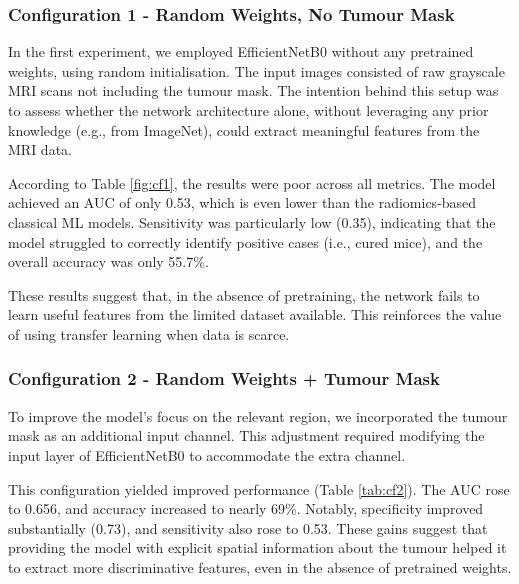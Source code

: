 \documentclass[12pt, a4paper]{report}
\begin{document}
\subsubsection{Configuration 1 - Random Weights, No Tumour Mask}

In the first experiment, we employed EfficientNetB0 without any pretrained weights, using random initialisation. The input images consisted of raw grayscale MRI scans not including the tumour mask. The intention behind this setup was to assess whether the network architecture alone, without leveraging any prior knowledge (e.g., from ImageNet), could extract meaningful features from the MRI data.

According to Table \ref{fig:cf1}, the results were poor across all metrics. The model achieved an AUC of only 0.53, which is even lower than the radiomics-based classical ML models. Sensitivity was particularly low (0.35), indicating that the model struggled to correctly identify positive cases (i.e., cured mice), and the overall accuracy was only 55.7\%.

\begin{table}[H]
\centering
{}
\caption{Configuration 1 - No weights} 
\label{fig:cf1}
\end{table}

These results suggest that, in the absence of pretraining, the network fails to learn useful features from the limited dataset available. This reinforces the value of using transfer learning when data is scarce.

\subsubsection{Configuration 2 - Random Weights + Tumour Mask}

To improve the model’s focus on the relevant region, we incorporated the tumour mask as an additional input channel. This adjustment required modifying the input layer of EfficientNetB0 to accommodate the extra channel.

This configuration yielded improved performance (Table \ref{tab:cf2}). The AUC rose to 0.656, and accuracy increased to nearly 69\%. Notably, specificity improved substantially (0.73), and sensitivity also rose to 0.53. These gains suggest that providing the model with explicit spatial information about the tumour helped it to extract more discriminative features, even in the absence of pretrained weights.
\end{document}
